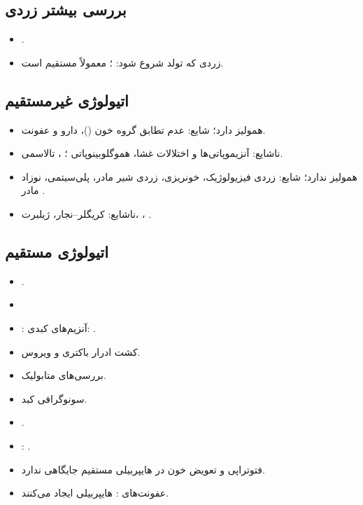 \documentclass[12pt,a4paper]{article}
\begin{document}
\subsection*{بررسی بیشتر زردی}
\begin{itemize}
\item[\AHmath{\ast}] .
\item زردی که  تولد شروع شود: ؛ معمولاً مستقیم است.
\end{itemize}
\subsection*{اتیولوژی غیرمستقیم}
\begin{itemize}
\item همولیز دارد؛ شایع: عدم تطابق گروه خون ()، دارو و عفونت.
\item ناشایع: آنزیموپاتی‌ها و اختلالات غشا، هموگلوبینوپاتی
؛
، تالاسمی.
\item همولیز ندارد؛ شایع: زردی فیزیولوژیک، خونریزی، زردی شیر مادر، پلی‌سیتمی، نوزاد مادر .
\item ناشایع: کریگلر–نجار، ژیلبرت، ، .
\end{itemize}
\subsection*{اتیولوژی مستقیم}
\begin{itemize}
\item {}.
\item {}
\item[\AHmath{\ast}] : آنزیم‌های کبدی:
.
\item کشت ادرار باکتری و ویروس.
\item بررسی‌های متابولیک.
\item سونوگرافی کبد.
\item {}.
\item {}: .
\item فتوتراپی و تعویض خون در هایپربیلی مستقیم جایگاهی ندارد.
\item عفونت‌های : هایپربیلی  ایجاد می‌کنند.
\end{itemize}
\end{document}
